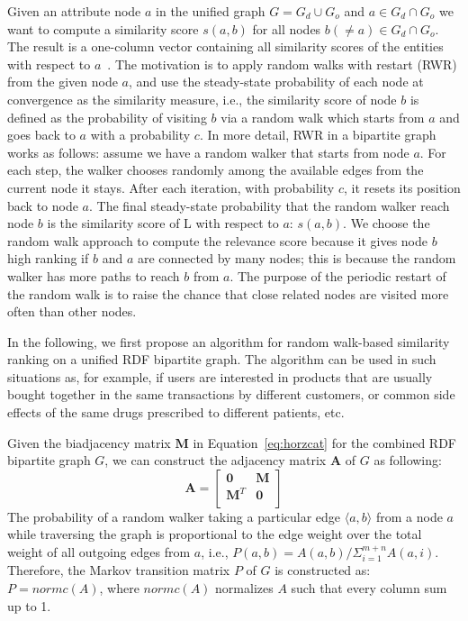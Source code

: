 Given an attribute node $a$ in the unified graph $G = G_d \cup G_o$ and $a \in G_d \cap G_o$ we want to compute a similarity score $s(a, b)$ for all nodes $b(\neq a) \in G_d \cap G_o$. The result is a one-column vector containing all similarity scores of the entities with respect to $a$~\cite{Chen_tuplerank:ranking}. The motivation is to apply random walks with restart (RWR) from the given node $a$, and use the steady-state probability of each node at convergence as the similarity measure, i.e., the similarity score of node $b$ is defined as the probability of visiting $b$ via a random walk which starts from $a$ and goes back to $a$ with a probability $c$. In more detail, RWR in a bipartite graph works as follows: assume we have a random walker that starts from node $a$. For each step, the walker chooses randomly among the available edges from the current node it stays. After each iteration, with probability $c$, it resets its position back to node $a$. The final steady-state probability that the random walker reach node $b$ is the similarity score of L with respect to $a$: $s(a, b)$. We choose the random walk approach to compute the relevance score because it gives node $b$ high ranking if $b$ and $a$ are connected by many nodes; this is because the random walker has more paths to reach $b$ from $a$. The purpose of the periodic restart of the random walk is to raise the chance that close related nodes are visited more often than other nodes.

In the following, we first propose an algorithm for random walk-based similarity ranking on a unified RDF bipartite graph. The algorithm can be used in such situations as, for example, if users are interested in products that are usually bought together in the same transactions by different customers, or common side effects of the same drugs prescribed to different patients, etc.

Given the biadjacency matrix $\mathbf{M}$ in Equation~\ref{eq:horzcat} for the combined RDF bipartite graph $G$, we can construct the adjacency matrix $\mathbf{A}$ of $G$ as following:
\[
\mathbf{A}=\left[
               \begin{array}{cc}
                 \mathbf{0}   & \mathbf{M} \\
                 \mathbf{M}^T & \mathbf{0} \\
               \end{array}
             \right]
\]
The probability of a random walker taking a particular edge $\langle a,b\rangle$ from a node $a$ while traversing the graph is proportional to the edge weight over the total weight of all outgoing edges from $a$, i.e., $P(a,b)=A(a,b)/\Sigma_{i=1}^{m+n}A(a,i)$. Therefore, the Markov transition matrix $P$ of $G$ is constructed as: $P=normc(A)$, where $normc(A)$ normalizes $A$ such that every column sum up to 1.

